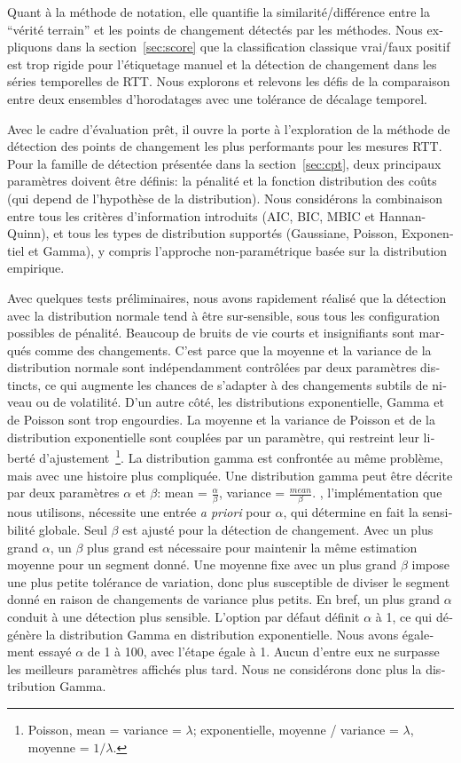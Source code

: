 \begin{otherlanguage}{french}
Quant à la méthode de notation, elle quantifie la similarité/différence entre la ``vérité terrain'' et les points de changement détectés par les méthodes.
Nous expliquons dans la section~\ref{sec:score} que la classification classique vrai/faux positif est trop rigide pour l'étiquetage manuel et la détection de changement dans les séries temporelles de RTT.
Nous explorons et relevons les défis de la comparaison entre deux ensembles d'horodatages avec une tolérance de décalage temporel.

Avec le cadre d'évaluation prêt, il ouvre la porte à l'exploration de la méthode de détection des points de changement les plus performants pour les mesures RTT.
Pour la famille de détection présentée dans la section~\ref{sec:cpt}, deux principaux paramètres doivent être définis: la pénalité et la fonction distribution des coûts (qui depend de l'hypothèse de la distribution).
Nous considérons la combinaison entre tous les critères d'information introduits (AIC, BIC, MBIC et Hannan-Quinn), 
et tous les types de distribution supportés (Gaussiane, Poisson, Exponentiel et Gamma), y compris l'approche non-paramétrique basée sur la distribution empirique.

Avec quelques tests préliminaires, nous avons rapidement réalisé que la détection avec la distribution normale tend à être sur-sensible, 
sous tous les configuration possibles de pénalité.
Beaucoup de bruits de vie courts et insignifiants sont marqués comme des changements.
C'est parce que la moyenne et la variance de la distribution normale sont indépendamment contrôlées par deux paramètres distincts, ce qui augmente les chances de s'adapter à des changements subtils de niveau ou de volatilité.
D'un autre côté, les distributions exponentielle, Gamma et de Poisson sont trop engourdies.
La moyenne et la variance de Poisson et de la distribution exponentielle sont couplées par un paramètre,
qui restreint leur liberté d'ajustement~\footnote{Poisson, mean = variance = $\lambda$; exponentielle, moyenne / variance = $\lambda$, moyenne = $1/\lambda$.}.
La distribution gamma est confrontée au même problème, mais avec une histoire plus compliquée.
Une distribution gamma peut être décrite par deux paramètres $\alpha$ et $\beta$: mean = $\frac{\alpha}{\beta}$, variance = $\frac{mean}{\beta}$.
\cite{Killick2013a}, l'implémentation que nous utilisons, nécessite une entrée \textit{a priori} pour $\alpha$, qui détermine en fait la sensibilité globale.
Seul $\beta$ est ajusté pour la détection de changement.
Avec un plus grand $\alpha$, un $\beta$ plus grand est nécessaire pour maintenir la même estimation moyenne pour un segment donné.
Une moyenne fixe avec un plus grand $\beta$ impose une plus petite tolérance de variation, donc plus susceptible de diviser le segment donné en raison de changements de variance plus petits.
En bref, un plus grand $\alpha$ conduit à une détection plus sensible.
L'option par défaut définit $\alpha$ à 1, ce qui dégénère la distribution Gamma en distribution exponentielle.
Nous avons également essayé $\alpha$ de 1 à 100, avec l'étape égale à 1.
Aucun d'entre eux ne surpasse les meilleurs paramètres affichés plus tard.
Nous ne considérons donc plus la distribution Gamma.


\end{otherlanguage}
